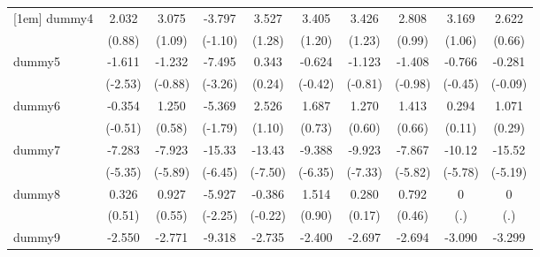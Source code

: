 {\begin{tabular}{l*{9}{c}}
[1em]
dummy4      &       2.032         &       3.075         &      -3.797         &       3.527         &       3.405         &       3.426         &       2.808         &       3.169         &       2.622         \\
            &      (0.88)         &      (1.09)         &     (-1.10)         &      (1.28)         &      (1.20)         &      (1.23)         &      (0.99)         &      (1.06)         &      (0.66)         \\
[1em]
dummy5      &      -1.611\sym{*}  &      -1.232         &      -7.495\sym{**} &       0.343         &      -0.624         &      -1.123         &      -1.408         &      -0.766         &      -0.281         \\
            &     (-2.53)         &     (-0.88)         &     (-3.26)         &      (0.24)         &     (-0.42)         &     (-0.81)         &     (-0.98)         &     (-0.45)         &     (-0.09)         \\
[1em]
dummy6      &      -0.354         &       1.250         &      -5.369         &       2.526         &       1.687         &       1.270         &       1.413         &       0.294         &       1.071         \\
            &     (-0.51)         &      (0.58)         &     (-1.79)         &      (1.10)         &      (0.73)         &      (0.60)         &      (0.66)         &      (0.11)         &      (0.29)         \\
[1em]
dummy7      &      -7.283\sym{***}&      -7.923\sym{***}&      -15.33\sym{***}&      -13.43\sym{***}&      -9.388\sym{***}&      -9.923\sym{***}&      -7.867\sym{***}&      -10.12\sym{***}&      -15.52\sym{***}\\
            &     (-5.35)         &     (-5.89)         &     (-6.45)         &     (-7.50)         &     (-6.35)         &     (-7.33)         &     (-5.82)         &     (-5.78)         &     (-5.19)         \\
[1em]
dummy8      &       0.326         &       0.927         &      -5.927\sym{*}  &      -0.386         &       1.514         &       0.280         &       0.792         &           0         &           0         \\
            &      (0.51)         &      (0.55)         &     (-2.25)         &     (-0.22)         &      (0.90)         &      (0.17)         &      (0.46)         &         (.)         &         (.)         \\
[1em]
dummy9      &      -2.550\sym{**} &      -2.771\sym{*}  &      -9.318\sym{***}&      -2.735\sym{*}  &      -2.400\sym{*}  &      -2.697\sym{*}  &      -2.694\sym{*}  &      -3.090\sym{*}  &      -3.299         \\

\end{tabular}}
